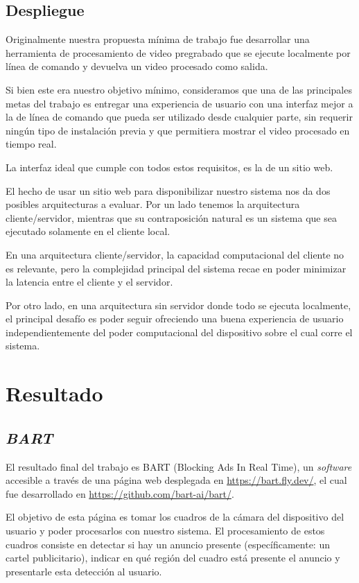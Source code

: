 \documentclass[a4paper]{article}
\begin{document}
\subsection{Despliegue}

Originalmente nuestra propuesta mínima de trabajo fue desarrollar una herramienta de procesamiento de video pregrabado que se ejecute localmente por línea de comando y devuelva un video procesado como salida.

Si bien este era nuestro objetivo mínimo, consideramos que una de las principales metas del trabajo es entregar una experiencia de usuario con una interfaz mejor a la de línea de comando que pueda ser utilizado desde cualquier parte, sin requerir ningún tipo de instalación previa y que permitiera mostrar el video procesado en tiempo real.

La interfaz ideal que cumple con todos estos requisitos, es la de un sitio web.

El hecho de usar un sitio web para disponibilizar nuestro sistema nos da dos posibles arquitecturas a evaluar. Por un lado tenemos la arquitectura cliente/servidor, mientras que su contraposición natural es un sistema que sea ejecutado solamente en el cliente local.

En una arquitectura cliente/servidor, la capacidad computacional del cliente no es relevante, pero la complejidad principal del sistema recae en poder minimizar la latencia entre el cliente y el servidor.

Por otro lado, en una arquitectura sin servidor donde todo se ejecuta localmente, el principal desafío es poder seguir ofreciendo una buena experiencia de usuario independientemente del poder computacional del dispositivo sobre el cual corre el sistema.

\section{Resultado}

\subsection{\textit{BART}}

El resultado final del trabajo es BART (Blocking Ads In Real Time), un \textit{software} accesible a través de una página web desplegada en \url{https://bart.fly.dev/}, el cual fue desarrollado en \url{https://github.com/bart-ai/bart/}.

El objetivo de esta página es tomar los cuadros de la cámara del dispositivo del usuario y poder procesarlos con nuestro sistema. El procesamiento de estos cuadros consiste en detectar si hay un anuncio presente (específicamente: un cartel publicitario), indicar en qué región del cuadro está presente el anuncio y presentarle esta detección al usuario.
\end{document}
